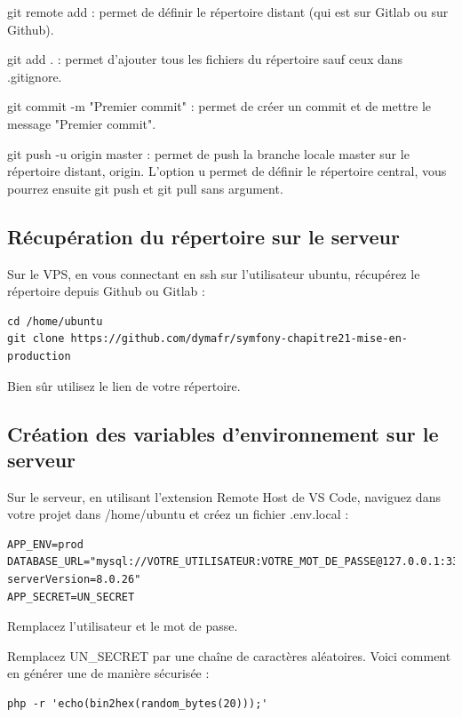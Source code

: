 \documentclass{article}
\begin{document}
git remote add : permet de définir le répertoire distant (qui est sur Gitlab ou sur Github).

git add . : permet d'ajouter tous les fichiers du répertoire sauf ceux dans .gitignore.

git commit -m "Premier commit" : permet de créer un commit et de mettre le message "Premier commit".

git push -u origin master : permet de push la branche locale master sur le répertoire distant, origin. L'option u permet de définir le répertoire central, vous pourrez ensuite git push et git pull sans argument.

\subsection{Récupération du répertoire sur le serveur}
Sur le VPS, en vous connectant en ssh sur l'utilisateur ubuntu, récupérez le répertoire depuis Github ou Gitlab :
\begin{verbatim}
cd /home/ubuntu
git clone https://github.com/dymafr/symfony-chapitre21-mise-en-production
\end{verbatim}

Bien sûr utilisez le lien de votre répertoire.

\subsection{Création des variables d'environnement sur le serveur}
Sur le serveur, en utilisant l'extension Remote Host de VS Code, naviguez dans votre projet dans /home/ubuntu et créez un fichier .env.local :
\begin{verbatim}
APP_ENV=prod
DATABASE_URL="mysql://VOTRE_UTILISATEUR:VOTRE_MOT_DE_PASSE@127.0.0.1:3306/quora?serverVersion=8.0.26"
APP_SECRET=UN_SECRET
\end{verbatim}

Remplacez l'utilisateur et le mot de passe.

Remplacez UN\_SECRET par une chaîne de caractères aléatoires. Voici comment en générer une de manière sécurisée :
\begin{verbatim}
php -r 'echo(bin2hex(random_bytes(20)));'
\end{verbatim}
\end{document}
